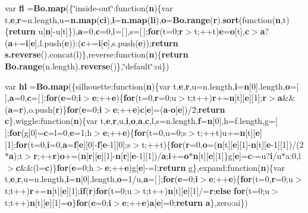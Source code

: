 \begin{DoxyCompactItemize}
\item 
var {\bf fl} ={\bf Bo.\+map}(\{\char`\"{}inside-\/out\char`\"{}\+:function({\bf n})\{var t,{\bf e},{\bf r}=n.\+length,u={\bf n.\+map}({\bf ci}),{\bf i}={\bf n.\+map}({\bf li}),{\bf o}={\bf Bo.\+range}({\bf r}).{\bf sort}(function({\bf n},t)\{{\bf return} u[{\bf n}]-\/u[t]\}),{\bf a}=0,{\bf c}=0,l=[$\,$],s=[$\,$];{\bf for}(t=0;{\bf r}$>$t;++t){\bf e}={\bf o}[t],{\bf c}$>${\bf a}?({\bf a}+={\bf i}[{\bf e}],l.\+push({\bf e}))\+:({\bf c}+={\bf i}[{\bf e}],s.\+push({\bf e}));{\bf return} {\bf s.\+reverse}().concat(l)\},reverse\+:function({\bf n})\{{\bf return} {\bf Bo.\+range}(n.\+length).{\bf reverse}()\},\char`\"{}default\char`\"{}\+:oi\})
\item 
var {\bf hl} ={\bf Bo.\+map}(\{silhouette\+:function({\bf n})\{var t,{\bf e},{\bf r},u=n.\+length,{\bf i}={\bf n}[0].length,{\bf o}=[$\,$],{\bf a}=0,{\bf c}=[$\,$];{\bf for}({\bf e}=0;{\bf i}$>${\bf e};++{\bf e})\{{\bf for}(t=0,{\bf r}=0;u$>$t;t++){\bf r}+={\bf n}[t][{\bf e}][1];{\bf r}$>${\bf a}\&\&({\bf a}={\bf r}),o.\+push({\bf r})\}{\bf for}({\bf e}=0;{\bf i}$>${\bf e};++{\bf e}){\bf c}[{\bf e}]=({\bf a}-\/{\bf o}[{\bf e}])/2;{\bf return} {\bf c}\},wiggle\+:function({\bf n})\{var t,{\bf e},{\bf r},u,{\bf i},{\bf o},{\bf a},{\bf c},l,s=n.\+length,{\bf f}={\bf n}[0],h=f.\+length,g=[$\,$];{\bf for}(g[0]={\bf c}=l=0,{\bf e}=1;h$>${\bf e};++{\bf e})\{{\bf for}(t=0,u=0;s$>$t;++t)u+={\bf n}[t][{\bf e}][1];{\bf for}(t=0,{\bf i}=0,{\bf a}={\bf f}[{\bf e}][0]-\/{\bf f}[{\bf e}-\/1][0];s$>$t;++t)\{{\bf for}({\bf r}=0,{\bf o}=({\bf n}[t][{\bf e}][1]-\/{\bf n}[t][{\bf e}-\/1][1])/(2$\ast${\bf a});t$>${\bf r};++{\bf r}){\bf o}+=({\bf n}[{\bf r}][{\bf e}][1]-\/{\bf n}[{\bf r}][{\bf e}-\/1][1])/{\bf a};{\bf i}+={\bf o}$\ast${\bf n}[t][{\bf e}][1]\}g[{\bf e}]={\bf c}-\/=u?{\bf i}/u$\ast$a\+:0,l$>${\bf c}\&\&(l={\bf c})\}{\bf for}({\bf e}=0;h$>${\bf e};++{\bf e})g[{\bf e}]-\/=l;{\bf return} g\},expand\+:function({\bf n})\{var t,{\bf e},{\bf r},u=n.\+length,{\bf i}={\bf n}[0].length,{\bf o}=1/u,{\bf a}=[$\,$];{\bf for}({\bf e}=0;{\bf i}$>${\bf e};++{\bf e})\{{\bf for}(t=0,{\bf r}=0;u$>$t;t++){\bf r}+={\bf n}[t][{\bf e}][1];{\bf if}({\bf r}){\bf for}(t=0;u$>$t;t++){\bf n}[t][{\bf e}][1]/={\bf r};{\bf else} {\bf for}(t=0;u$>$t;t++){\bf n}[t][{\bf e}][1]={\bf o}\}{\bf for}({\bf e}=0;{\bf i}$>${\bf e};++{\bf e}){\bf a}[{\bf e}]=0;{\bf return} {\bf a}\},zero\+:ai\})
\item 

\end{DoxyCompactItemize}

